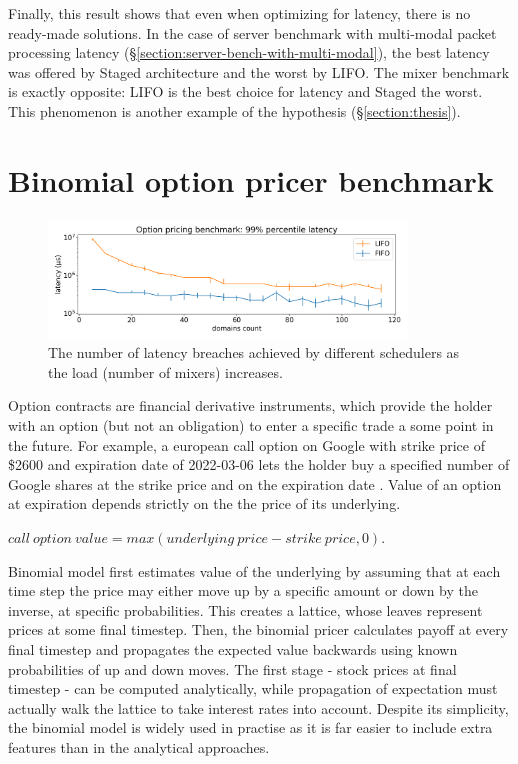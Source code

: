 \documentclass[12pt,a4paper,twoside]{report}
\begin{document}
Finally, this result shows that even when optimizing for latency, there is no ready-made solutions. In the case of server benchmark with multi-modal packet processing latency (\S\ref{section:server-bench-with-multi-modal}), the best latency was offered by Staged architecture and the worst by LIFO. The mixer benchmark is exactly opposite: LIFO is the best choice for latency and Staged the worst. This phenomenon is another example of the hypothesis (\S\ref{section:thesis}). 

\section{Binomial option pricer benchmark}
\label{section:binomial_option_pricer_result}

\begin{figure} 
    \centering 
    \includegraphics[width=0.85\textwidth]{eval/options-base.png}
    \caption{The number of latency breaches achieved by different schedulers as the load (number of mixers) increases.}
   \label{fig:options-bench}
\end{figure}

Option contracts are financial derivative instruments, which provide the holder with an option (but not an obligation) to enter a specific trade a some point in the future. For example, a european call option on Google with strike price of \$2600 and expiration date of 2022-03-06 lets the holder buy a specified number of Google shares at the strike price and on the expiration date \cite{Hull_John}. Value of an option at expiration depends strictly on the the price of its underlying.

\begin{center}
$call\:option\:value = max(underlying\:price - strike\:price, 0)$.
\end{center}

Binomial model first estimates value of the underlying by assuming that at each time step the price may either move up by a specific amount or down by the inverse, at specific probabilities. This creates a lattice, whose leaves represent prices at some final timestep. Then, the binomial pricer calculates payoff at every final timestep and propagates the expected value backwards using known probabilities of up and down moves. The first stage - stock prices at final timestep - can be computed analytically, while propagation of expectation must actually walk the lattice to take interest rates into account. Despite its simplicity, the binomial model is widely used in practise as it is far easier to include extra features than in the analytical approaches.
\end{document}
